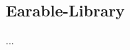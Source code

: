 \documentclass[../entwurf.tex]{subfiles}
\begin{document}
\subsection{Earable-Library}
...
\end{document}
